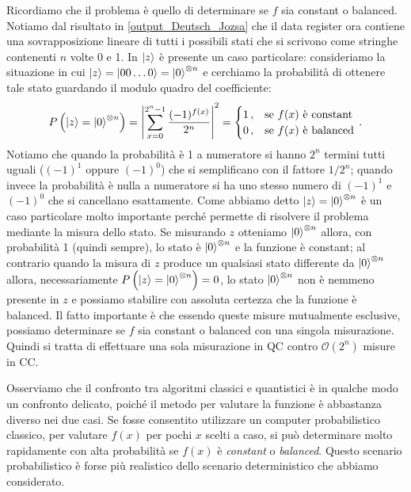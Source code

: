 \noindent Ricordiamo che il problema è quello di determinare se $f$ sia constant o balanced. Notiamo dal risultato in \eqref{output_Deutsch_Jozsa} che il data register ora contiene una sovrapposizione lineare di tutti i possibili stati che si scrivono come stringhe contenenti $n$ volte 0 e 1. In $\ket{z}$ è presente un caso particolare: consideriamo la situazione in cui $\ket z = \ket{00\ldots0} = \ket0^{\otimes n}$ e cerchiamo la probabilità di ottenere tale stato guardando il modulo quadro del coefficiente:
\begin{equation*}
    P \left( \ket{z} = \ket0^{\otimes n} \right) = \abs{\sum_{x=0}^{2^n-1}\frac{(-1)^{f(x)}}{2^n}}^2 = 
    \begin{cases}
    1 \, , &\text{se } f(x) \text{ è constant} \\
    0 \, , &\text{se } f(x) \text{ è balanced} 
    \end{cases} \, .
\end{equation*}
Notiamo che quando la probabilità è 1 a numeratore si hanno $2^n$ termini tutti uguali ($(-1)^1$ oppure $(-1)^0$) che si semplificano con il fattore $1/2^n$; quando invece la probabilità è nulla a numeratore si ha uno stesso numero di $(-1)^1$ e $(-1)^0$ che si cancellano esattamente. Come abbiamo detto $\ket z=\ket0^{\otimes n}$ è un caso particolare molto importante perché permette di risolvere il problema mediante la misura dello stato. Se misurando $z$ otteniamo $\ket{0}^{\otimes n}$ allora, con probabilità 1 (quindi sempre), lo stato è $\ket{0}^{\otimes n}$ e la funzione è constant; al contrario quando la misura di $z$ produce un qualsiasi stato differente da $\ket{0}^{\otimes n}$ allora, necessariamente $P \left( \ket{z} = \ket0^{\otimes n} \right) = 0$, lo stato $\ket{0}^{\otimes n}$ non è nemmeno presente in $z$ e possiamo stabilire con assoluta certezza che la funzione è balanced. Il fatto importante è che essendo queste misure mutualmente esclusive, possiamo determinare se $f$ sia constant o balanced con una singola misurazione. Quindi si tratta di effettuare una sola misurazione in QC contro $\mathcal{O}(2^n)$ misure in CC.

\noindent Osserviamo che il confronto tra algoritmi classici e quantistici è in qualche modo un confronto delicato, poiché il metodo per valutare la funzione è abbastanza diverso nei due casi. Se fosse consentito utilizzare un computer probabilistico classico, per valutare $f(x)$ per pochi $x$ scelti a caso, si può determinare molto rapidamente con alta probabilità se $f(x)$ è \textit{constant} o \textit{balanced}. Questo scenario probabilistico è forse più realistico dello scenario deterministico che abbiamo considerato.

